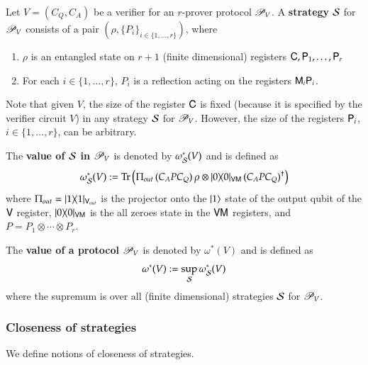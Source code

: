 Let $V = (C_Q,C_A)$ be a verifier for an $r$-prover protocol $\mathscr{P}_V$. A \textbf{strategy} $\mathcal{S}$ for $\mathscr{P}_V$ consists of a pair $(\rho,\{P_i\}_{i\in\{1,\ldots,r\}})$, where
\begin{enumerate}
	\item $\rho$ is an entangled state on $r+1$ (finite dimensional) registers ${\mathsf{C}}, {\mathsf{P}}_1, \ldots, {\mathsf{P}}_r$
	\item For each $i\in\{1,\ldots,r\}$, $P_i$ is a reflection acting on the registers ${\mathsf{M}}_i {\mathsf{P}}_i$.
\end{enumerate}
Note that given $V$, the size of the register ${\mathsf{C}}$ is fixed (because it is specified by the verifier circuit $V$) in any strategy $\mathcal{S}$ for $\mathscr{P}_V$. However, the size of the registers ${\mathsf{P}}_i$, $i\in\{1,\ldots,r\}$, can be arbitrary.

The \textbf{value of $\mathcal{S}$ in $\mathscr{P}_V$} is denoted by $\omega^*_{\mathcal{S}}(V)$ and is defined as
\[
	\omega^*_{\mathcal{S}}(V) := \operatorname{Tr} \left( \Pi_{out} \, ( C_A P C_Q) \, \rho \otimes |0\rangle\! \langle 0|_{{\mathsf{V}} {\mathsf{M}}} \, (C_A P C_Q)^\dagger\right)
\]
where $\Pi_{out} = |1\rangle\! \langle 1|_{{\mathsf{V}}_{out}}$ is the projector onto the $|1\rangle$ state of the output qubit of the ${\mathsf{V}}$ register, $|0\rangle\! \langle 0|_{{\mathsf{V}} {\mathsf{M}}}$ is the all zeroes state in the ${\mathsf{V}} {\mathsf{M}}$ registers, and $P = P_1 \otimes \cdots \otimes P_r$. 


The \textbf{value of a protocol $\mathscr{P}_V$} is denoted by $\omega^*(V)$ and is defined as 
\[
	\omega^*(V) := \sup_{\mathcal{S}} \omega^*_{\mathcal{S}}(V)
\]
where the supremum is over all (finite dimensional) strategies $\mathcal{S}$ for $\mathscr{P}_V$. 



\subsubsection{Closeness of strategies} 

We define notions of closeness of strategies. 
%

